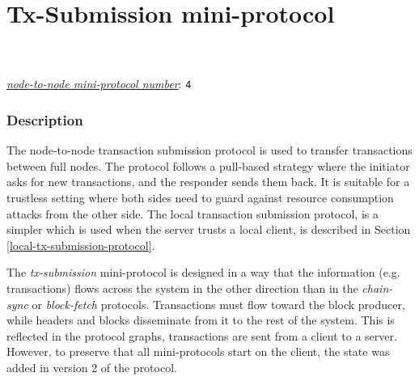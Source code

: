 \section{Tx-Submission mini-protocol}
\\
\\
\hyperref[table:node-to-node-protocol-numbers]{\textit{node-to-node mini-protocol number}}: \texttt{4}\\
\label{tx-submission-protocol}
\label{tx-submission-protocol2}

\newcommand{\StInit}             {\state{StInit}}
\newcommand{\MsgInit}            {\msg{MsgInit}}
\newcommand{\StTxIdsBlocking}    {\state{StTxIdsBlocking}}
\newcommand{\StTxIdsNonBlocking} {\state{StTxIdsNonBlocking}}
\newcommand{\StTxs}              {\state{StTxs}}
\newcommand{\MsgRequestTxIdsNB}  {\msg{MsgRequestTxIdsNonBlocking}}
\newcommand{\MsgRequestTxIdsB}   {\msg{MsgRequestTxIdsBlocking}}
\newcommand{\MsgReplyTxIds}      {\msg{MsgReplyTxIds}}
\newcommand{\MsgRequestTxs}      {\msg{MsgRequestTxs}}
\newcommand{\MsgReplyTxs}        {\msg{MsgReplyTxs}}

\subsubsection{Description}
The node-to-node transaction submission protocol is used to transfer
transactions between full nodes.  The protocol follows a pull-based strategy
where the initiator asks for new transactions, and the responder sends them
back.  It is suitable for a trustless setting where both sides need to guard
against resource consumption attacks from the other side.  The local
transaction submission protocol, is a simpler which is used when the server trusts a local
client, is described in Section \ref{local-tx-submission-protocol}.

The \textit{tx-submission} mini-protocol is designed in a way that the
information (e.g. transactions) flows across the system in the other direction
than in the \textit{chain-sync} or \textit{block-fetch} protocols.
Transactions must flow toward the block producer, while headers and blocks
disseminate from it to the rest of the system.  This is reflected in the
protocol graphs, transactions are sent from a client to
a server.  However, to preserve that all mini-protocols start on the client,
the \StInit{} state was added in version 2 of the protocol.

